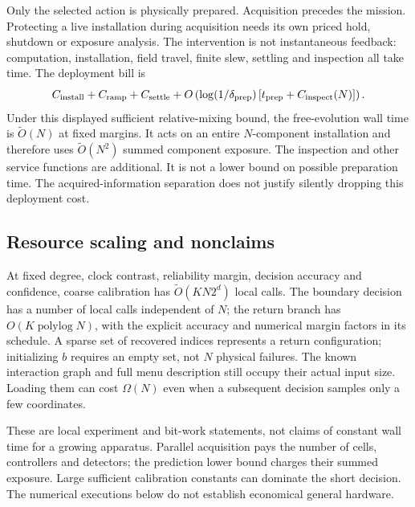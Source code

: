 Only the selected action is physically prepared. Acquisition precedes the mission. Protecting a live installation during acquisition needs its own priced hold, shutdown or exposure analysis. The intervention is not instantaneous feedback: computation, installation, field travel, finite slew, settling and inspection all take time. The deployment bill is
\begin{equation}
 C_{
\rm install}+C_{
\rm ramp}+C_{
\rm settle}
 +O\left(\log(1/\delta_{
\rm prep})\,[t_{
\rm prep}+C_{
\rm inspect}(N)]\right).
 \label{eq:deployment}
\end{equation}
Under this displayed sufficient relative-mixing bound, the free-evolution wall time is $\widetilde O(N)$ at fixed margins. It acts on an entire $N$-component installation and therefore uses $\widetilde O(N^2)$ summed component exposure. The inspection and other service functions are additional. It is not a lower bound on possible preparation time. The acquired-information separation does not justify silently dropping this deployment cost.

\subsection{Resource scaling and nonclaims}
At fixed degree, clock contrast, reliability margin, decision accuracy and confidence, coarse calibration has $\widetilde O(KN2^d)$ local calls. The boundary decision has a number of local calls independent of $N$; the return branch has $O(K\operatorname{polylog}N)$, with the explicit accuracy and numerical margin factors in its schedule. A sparse set of recovered indices represents a return configuration; initializing $b$ requires an empty set, not $N$ physical failures. The known interaction graph and full menu description still occupy their actual input size. Loading them can cost $\Omega(N)$ even when a subsequent decision samples only a few coordinates.

These are local experiment and bit-work statements, not claims of constant wall time for a growing apparatus. Parallel acquisition pays the number of cells, controllers and detectors; the prediction lower bound charges their summed exposure. Large sufficient calibration constants can dominate the short decision. The numerical executions below do not establish economical general hardware.
